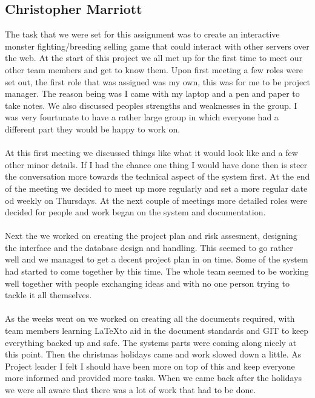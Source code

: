 \documentclass{project}
\begin{document}
\subsection{Christopher Marriott}
The task that we were set for this assignment was to create an interactive monster fighting/breeding selling game that could interact with other servers over the web. At the start of this project we all met up for the first time to meet our other team members and get to know them. Upon first meeting a few roles were set out, the first role that was assigned was my own, this was for me to be project manager. The reason being was I came with my laptop and a pen and paper to take notes. We also discussed peoples strengths and weaknesses in the group. I was very fourtunate to have a rather large group in which everyone had a different part they would be happy to work on.
\\\\
At this first meeting we discussed things like what it would look like and a few other minor details. If I had the chance one thing I would have done then is steer the conversation more towards the technical aspect of the system first. At the end of the meeting we decided to meet up more regularly and set a more regular date od weekly on Thursdays. At the next couple of meetings more detailed roles were decided for people and work began on the system and documentation.
\\\\
Next the we worked on creating the project plan and risk assesment, designing the interface and the database design and handling. This seemed to go rather well and we managed to get a decent project plan in on time. Some of the system had started to come together by this time. The whole team seemed to be working well together with people exchanging ideas and with no one person trying to tackle it all themselves.
\\\\
As the weeks went on we worked on creating all the documents required, with team members learning \LaTeX to aid in the document standards and GIT to keep everything backed up and safe. The systems parts were coming along nicely at this point. Then the christmas holidays came and work slowed down a little. As Project leader I felt I should have been more on top of this and keep everyone more informed and provided more tasks. When we came back after the holidays we were all aware that there was a lot of work that had to be done.
\\\\
\end{document}
